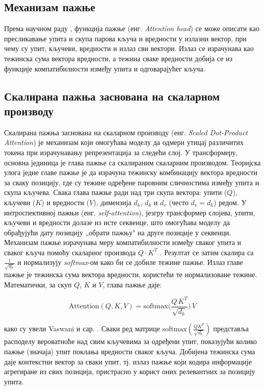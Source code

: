 \documentclass[a4paper, 12pt, master, utf8]{etf}
\begin{document}
\subsection{Механизам пажње}

Према научном раду \cite{vaswani_attention_2017}, функција пажње (енг. \textit{Attention head}) се може описати као пресликавање упита и скупа парова кључа и вредности у излазни вектор, при чему су упит, кључеви, вредности и излаз сви вектори. Излаз се израчунава као тежинска сума вектора вредности, а тежина сваке вредности добија се из функције компатибилности између упита и одговарајућег кључа.

\subsection{Скалирана пажња заснована на скаларном производу}

Скалирана пажња заснована на скаларном производу (енг. \textit{Scaled Dot-Product Attention}) је механизам који омогућава моделу да одмери утицај различитих токена при израчунавању репрезентација за следећи слој. У трансформеру, основна јединица је глава пажње са скалираним скаларним производом. Теоријска улога једне главе пажње је да израчуна тежинску комбинацију вектора вредности за сваку позицију, где су тежине одређене паровним сличностима између упита и скупа кључева. Свака глава пажње ради над три скупа вектора: упити ($Q$), кључеви ($K$) и вредности ($V$), димензија $d_k$, $d_k$ и $d_v$ (често $d_v = d_k$) редом. У интроспективној пажњи (енг. \textit{self-attention}), језгру трансформер слојева, упити, кључеви и вредности долазе из исте секвенце, што омогућава моделу да обрађујући дату позицију „обрати пажњу" на друге позиције у секвенци. Механизам пажње израчунава меру компатибилности између сваког упита и сваког кључа помоћу скаларног производа $Q \cdot K^T$ \cite{vaswani_attention_2017}. Резултат се затим скалира са $\frac{1}{\sqrt{d_k}}$ и нормализују \textit{softmax}-ом како би се добиле тежине пажње. Излаз главе пажње је тежинска сума вектора вредности, користећи те нормализоване тежине. Математички, за скуп $Q$, $K$ и $V$, глава пажње даје:

\begin{equation}
\text{Attention}(Q, K, V) = \text{softmax}\!\Big( \frac{Q\,K^T}{\sqrt{d_k}}\Big)\,V
\label{eq:attention}
\end{equation}

како су увели Vaswani и сар. \cite{vaswani_attention_2017}. Сваки ред матрице $\text{softmax}(\frac{QK^T}{\sqrt{d_k}})$ представља расподелу вероватноће над свим кључевима за одређени упит, показујући колико пажње (значаја) упит поклања вредности сваког кључа. Добијена тежинска сума даје контекстни вектор за сваки упит, тј. излаз пажње који кодира информације агрегиране из свих позиција, пристрасно у корист оних релевантних за позицију упита.
\end{document}
